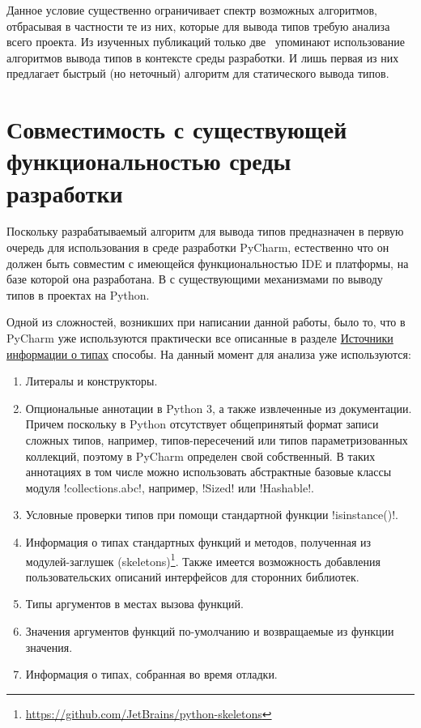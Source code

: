 Данное условие существенно ограничивает спектр возможных алгоритмов, отбрасывая
в частности те из них, которые для вывода типов требую анализа всего проекта. Из
 изученных публикаций только две~\cite{Pluquet2009,Haupt2011} упоминают
использование алгоритмов вывода типов в контексте среды разработки. И лишь
первая из них предлагает быстрый (но неточный) алгоритм для статического вывода типов.

\section{Совместимость с существующей функциональностью среды разработки}

Поскольку разрабатываемый алгоритм для вывода типов предназначен в первую
очередь для использования в среде разработки PyCharm, естественно что он должен
быть совместим с имеющейся функциональностью IDE и платформы, на базе которой
она разработана. В с существующими механизмами по выводу типов в проектах на
Python. 

Одной из сложностей, возникших при написании данной работы, было то, что в
PyCharm уже используются практически все описанные в разделе
\hyperref[sec:type-sources]{Источники информации о типах} способы. На данный
момент для анализа уже используются:

\begin{enumerate}
    \item{%
        Литералы и конструкторы.
      }
    \item{%
        Опциональные аннотации в Python 3, а также извлеченные из
        документации. Причем поскольку в Python отсутствует общепринятый формат
        записи сложных типов, например, типов-пересечений или типов
        параметризованных коллекций, поэтому в PyCharm определен свой собственный.
        В таких аннотациях в том числе можно использовать абстрактные базовые
        классы модуля !collections.abc!, например, !Sized! или !Hashable!.
    }
    \item{%
        Условные проверки типов при помощи стандартной функции !isinstance()!.
      }
    \item{%
        Информация о типах стандартных функций и методов, полученная из
        модулей-заглушек
        (skeletons)\footnote{\url{https://github.com/JetBrains/python-skeletons}}.
        Также имеется возможность добавления пользовательских описаний
        интерфейсов для сторонних библиотек.
      }
    \item{%
        Типы аргументов в местах вызова функций.
      }
    \item{%
        Значения аргументов функций по-умолчанию и возвращаемые из функции
        значения.
      }
    \item{%
        Информация о типах, собранная во время отладки.
      }
\end{enumerate}

